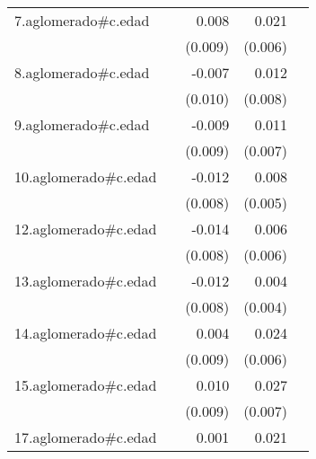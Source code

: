 {\begin{longtable}{l*{4}{D{.}{.}{-1}}}
\addlinespace
7.aglomerado#c.edad&                     &       0.008         &       0.021\sym{***}&                     \\
            &                     &     (0.009)         &     (0.006)         &                     \\
\addlinespace
8.aglomerado#c.edad&                     &      -0.007         &       0.012         &                     \\
            &                     &     (0.010)         &     (0.008)         &                     \\
\addlinespace
9.aglomerado#c.edad&                     &      -0.009         &       0.011         &                     \\
            &                     &     (0.009)         &     (0.007)         &                     \\
\addlinespace
10.aglomerado#c.edad&                     &      -0.012         &       0.008         &                     \\
            &                     &     (0.008)         &     (0.005)         &                     \\
\addlinespace
12.aglomerado#c.edad&                     &      -0.014         &       0.006         &                     \\
            &                     &     (0.008)         &     (0.006)         &                     \\
\addlinespace
13.aglomerado#c.edad&                     &      -0.012         &       0.004         &                     \\
            &                     &     (0.008)         &     (0.004)         &                     \\
\addlinespace
14.aglomerado#c.edad&                     &       0.004         &       0.024\sym{***}&                     \\
            &                     &     (0.009)         &     (0.006)         &                     \\
\addlinespace
15.aglomerado#c.edad&                     &       0.010         &       0.027\sym{***}&                     \\
            &                     &     (0.009)         &     (0.007)         &                     \\
\addlinespace
17.aglomerado#c.edad&                     &       0.001         &       0.021\sym{*}  &                     \\

\end{longtable}}
